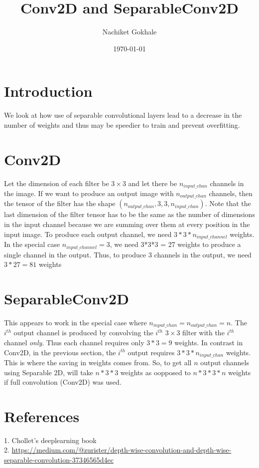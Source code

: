 \documentclass{article}
\begin{document}
\title{Conv2D and SeparableConv2D}
\author{Nachiket Gokhale}
\date{\today}
\maketitle
\section{Introduction}
We look at how use of separable convolutional layers lead to a decrease in the number of weights and thus may be speedier to train and prevent overfitting.
\section{Conv2D}
Let the dimension of each filter be $3\times3$ and let there be $n_{input\_chan}$ channels in the image. If we want to produce an output image with $n_{output\_chan}$ channels, then the tensor of the filter has the shape $(n_{output\_chan},3,3,n_{input\_chan})$. Note that the last dimension of the filter tensor has to be the same as the number of dimensions in the input channel because we are summing over them at every position in the input image. To produce each output channel, we need $3*3*n_{input\_channel}$ weights. In the special case $n_{input\_channel}=3$, we need 3*3*3 = 27 weights to produce a single channel in the output. Thus, to produce 3 channels in the output, we need $3*27=81$ weights
\section{SeparableConv2D}
This appears to work in the special case where $n_{input\_chan}=n_{output\_chan}=n$. The $i^{th}$ output channel is produced by convolving the $i^{th}$ $3\times3$ filter with the $i^{th}$ channel \textit{only}. Thus each channel requires only $3*3=9$ weights. In contrast in Conv2D, in the previous section, the $i^{th}$ output requires $3*3*n_{input\_chan}$ weights. This is where the saving in weights comes from. So, to get all $n$ output channels using Separable 2D, will take $n*3*3$ weights as oopposed to $n*3*3*n$ weights if full convolution (Conv2D) was used. 
\section{References}
1. Chollet's deeplearning book\\
2. \url{https://medium.com/@zurister/depth-wise-convolution-and-depth-wise-separable-convolution-37346565d4ec}
\end{document}
